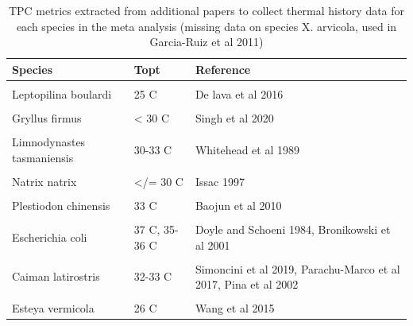 \documentclass[12pt,twoside]{reedthesis}
\begin{document}
\begin{table}[!h]

\caption[Thermal stress data by species]{\label{tab:unnamed-chunk-31}TPC metrics extracted from additional papers to collect thermal history data for each species in the meta analysis (missing data on species X. arvicola, used in Garcia-Ruiz et al 2011)}
\centering
\begin{tabular}[t]{ll>{\raggedright\arraybackslash}p{6cm}}
\toprule
\textbf{Species} & \textbf{Topt} & \textbf{Reference}\\
\midrule
\cellcolor{gray!6}{Drosophila melanogaster} & \cellcolor{gray!6}{24-26.6 C} & \cellcolor{gray!6}{Klepsatel 2013, David 1988}\\
Leptopilina boulardi & 25 C & De lava et al 2016\\
\cellcolor{gray!6}{Mauremys reevesii} & \cellcolor{gray!6}{37.97 +/- 0.64} & \cellcolor{gray!6}{Dang et al 2019}\\
Gryllus firmus & < 30 C & Singh et al 2020\\
\cellcolor{gray!6}{Limnodynastes peronii} & \cellcolor{gray!6}{30 C} & \cellcolor{gray!6}{Seebacher et al 2014}\\
\addlinespace
Limnodynastes tasmaniensis & 30-33 C & Whitehead et al 1989\\
\cellcolor{gray!6}{Platyplectrum ornatum} & \cellcolor{gray!6}{33 C} & \cellcolor{gray!6}{Kern et al 2014}\\
Natrix natrix & </= 30 C & Issac 1997\\
\cellcolor{gray!6}{Coturnix japoncia} & \cellcolor{gray!6}{26 C} & \cellcolor{gray!6}{Alagawany et al 2017}\\
Plestiodon chinensis & 33 C & Baojun et al 2010\\
\addlinespace
\cellcolor{gray!6}{Rhodnis prolixus} & \cellcolor{gray!6}{30-35 C} & \cellcolor{gray!6}{Fresquet and Lazzari 2011}\\
Escherichia coli & 37 C, 35-36 C & Doyle and Schoeni 1984, Bronikowski et al 2001\\
\cellcolor{gray!6}{Salmonella} & \cellcolor{gray!6}{35-36 C} & \cellcolor{gray!6}{Bronikowski et al 2001}\\
Caiman latirostris & 32-33 C & Simoncini et al 2019, Parachu-Marco et al 2017, Pina et al 2002\\
\cellcolor{gray!6}{Trachemys scripta} & \cellcolor{gray!6}{32-33 C} & \cellcolor{gray!6}{Dang et al 2019}\\
\addlinespace
Esteya vermicola & 26 C & Wang et al 2015\\
\bottomrule
\end{tabular}
\end{table}
\backmatter
\end{document}
